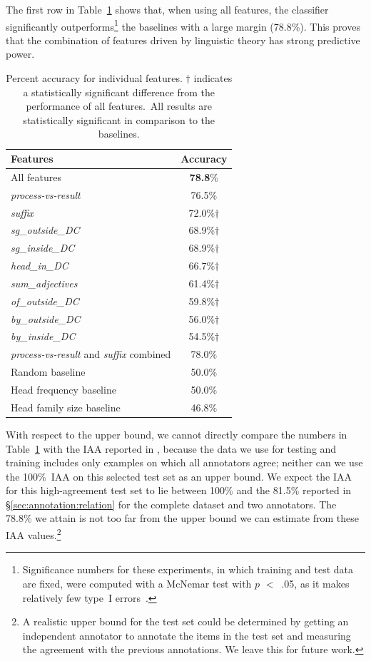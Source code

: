 \documentclass[output=paper]{langsci/langscibook}
\begin{document}
The first row in Table~\ref{tab:individual} shows that, when using all features, the classifier significantly outperforms\footnote{Significance numbers for these experiments, in which training and test data are fixed, were computed with a McNemar test with $p$ $<$~.05, as it makes relatively few type~I errors~\citep{dietterich:98}.} the baselines with a large margin (78.8\%). 
This proves that the combination of 
features driven by linguistic theory has strong predictive power. 

\begin{table}
\caption{\label{tab:individual}Percent accuracy for individual features. $\dagger$ indicates a statistically significant difference from the performance of all features.\ All results are statistically significant in comparison to the  baselines.}
{\small \begin{tabular}{lc}
\textbf{Features}&\textbf{Accuracy}\\
\hline
All features&\textbf{78.8}\%\\
\textit{process-vs-result}&76.5\%\\
\textit{suffix}&72.0\%$\dagger$\\
\textit{sg\_outside\_DC}&68.9\%$\dagger$\\
\textit{sg\_inside\_DC}&68.9\%$\dagger$\\
\textit{head\_in\_DC}&66.7\%$\dagger$\\
\textit{sum\_adjectives}&61.4\%$\dagger$\\
\textit{of\_outside\_DC}&59.8\%$\dagger$\\
\textit{by\_outside\_DC}& 56.0\%$\dagger$\\
\textit{by\_inside\_DC} &54.5\%$\dagger$\\
\textit{process-vs-result} and \textit{suffix} combined& 78.0\%\\
\hline
 Random baseline&50.0\%\\
 Head frequency baseline&50.0\%\\
 Head family size baseline&46.8\%\\
\end{tabular}}
\end{table}


With respect to the upper bound, we cannot directly compare the numbers in Table~\ref{tab:individual} with the IAA reported in , because the data we use for testing and training includes only examples on which all annotators agree; neither can we use the 100\%~IAA on this selected test set as an upper bound. We expect the IAA for this high-agreement test set to lie between 100\% and the 81.5\% reported in §\ref{sec:annotation:relation} for the complete dataset and two annotators. The 78.8\% we attain is not too far from the upper bound we can estimate from these IAA values.\footnote{A realistic upper bound for the test set could be determined by getting an independent annotator to annotate the items in the test set and measuring the agreement with the previous annotations.  We leave this for future work.} 
\end{document}
